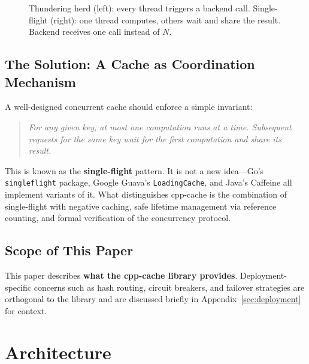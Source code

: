 \documentclass[11pt,a4paper]{article}
\begin{document}
\begin{figure}[htbp]
\caption{Thundering herd (left): every thread triggers a backend call.
         Single-flight (right): one thread computes, others wait and
         share the result.  Backend receives one call instead of $N$.}
\label{fig:thundering-herd}
\end{figure}

\subsection{The Solution: A Cache as Coordination Mechanism}

A well-designed concurrent cache should enforce a simple invariant:

\begin{quote}
\emph{For any given key, at most one computation runs at a time.
Subsequent requests for the same key wait for the first computation
and share its result.}
\end{quote}

This is known as the \textbf{single-flight} pattern.  It is not a new
idea---Go's \texttt{singleflight} package, Google Guava's
\texttt{LoadingCache}, and Java's Caffeine all implement variants of
it.  What distinguishes cpp-cache is the combination of single-flight
with negative caching, safe lifetime management via reference counting,
and formal verification of the concurrency protocol.

\subsection{Scope of This Paper}

This paper describes \textbf{what the cpp-cache library provides}.
Deployment-specific concerns such as hash routing, circuit breakers, and
failover strategies are orthogonal to the library and are discussed
briefly in Appendix~\ref{sec:deployment} for context.

\section{Architecture}
\label{sec:architecture}
\end{document}
